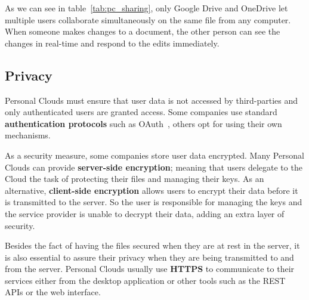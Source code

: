 As we can see in table~\ref{tab:pc_sharing}, only Google Drive and OneDrive let multiple users collaborate simultaneously on the same file from any computer. When someone makes changes to a document, the other person can see the changes in real-time and respond to the edits immediately.

\subsection{Privacy}


Personal Clouds must ensure that user data is not accessed by third-parties and only authenticated users are granted access. Some companies use standard \textbf{authentication protocols} such as OAuth~\cite{oauth}, others opt for using their own mechanisms.

As a security measure, some companies store user data encrypted. Many Personal Clouds can provide \textbf{server-side encryption}; meaning that users delegate to the Cloud the task of protecting their files and managing their keys. As an alternative, \textbf{client-side encryption} allows users to encrypt their data before it is transmitted to the server. So the user is responsible for managing the keys and the service provider is unable to decrypt their data, adding an extra layer of security.

Besides the fact of having the files secured when they are at rest in the server, it is also essential to assure their privacy when they are being transmitted to and from the server. Personal Clouds usually use \textbf{HTTPS} to communicate to their services either from the desktop application or other tools such as the REST APIs or the web interface.


